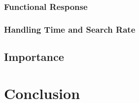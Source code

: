\documentclass{article}
\begin{document}
\subsubsection{Functional Response}
\subsubsection{Handling Time and Search Rate}



\subsection{Importance}

\section{Conclusion}




\clearpage{}

%
%
\printbibliography
\end{document}
